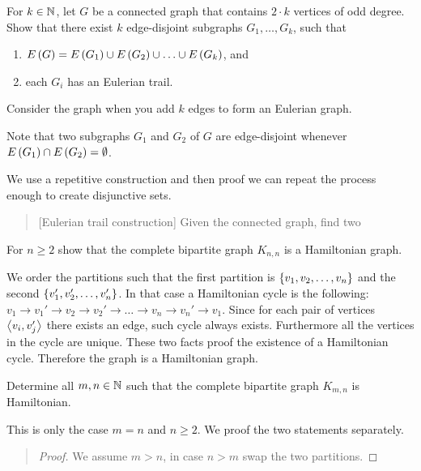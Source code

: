 \documentclass{article}
\begin{document}
\begin{exercise}
For $k\in\mathbb{N}$, let $G$ be a connected graph that contains $2\cdot k$ vertices of odd degree. Show that there exist $k$ edge-disjoint subgraphs $G_1,\ldots,G_k$, such that
\begin{enumerate}
 \item $E\left( G \right)=E\left( G_1 \right)\cup E\left( G_2 \right)\cup\ldots\cup E\left( G_k \right)$, and
 \item each $G_i$ has an Eulerian trail.
\end{enumerate}
\begin{hint}
Consider the graph when you add $k$ edges to form an Eulerian graph.
\end{hint}
\begin{note}
Note that two subgraphs $G_1$ and $G_2$ of $G$ are edge-disjoint whenever $E\left( G_1 \right)\cap E\left( G_2 \right)=\emptyset$.
\begin{answer}
We use a repetitive construction and then proof we can repeat the process enough to create disjunctive sets.
\begin{quote}[Eulerian trail construction]
Given the connected graph, find two 
\end{quote}

\end{answer}
\end{note}
\end{exercise}

\begin{exercise}
For $n\geq2$ show that the complete bipartite graph $K_{n,n}$ is a Hamiltonian graph.
\begin{answer}
We order the partitions such that the first partition is $\left\{ v_1,v_2,\ldots,v_n \right\}$ and the second $\left\{ v_1',v_2',\ldots,v_n' \right\}$. In that case a Hamiltonian cycle is the following: $v_1\rightarrow v_1'\rightarrow v_2\rightarrow v_2'\rightarrow\ldots\rightarrow v_n\rightarrow v_n'\rightarrow v_1$. Since for each pair of vertices $\left\langle v_i,v_j' \right\rangle$ there exists an edge, such cycle always exists. Furthermore all the vertices in the cycle are unique. These two facts proof the existence of a Hamiltonian cycle. Therefore the graph is a Hamiltonian graph.
\end{answer}
\end{exercise}

\begin{exercise}
Determine all $m,n\in\mathbb{N}$ such that the complete bipartite graph $K_{m,n}$ is Hamiltonian.
\begin{answer}
This is only the case $m=n$ and $n\geq 2$. We proof the two statements separately.
\begin{quote}\begin{proof}
We assume $m>n$, in case $n>m$ swap the two partitions.
\end{proof}\end{quote}
\end{answer}
\end{exercise}
\end{document}
